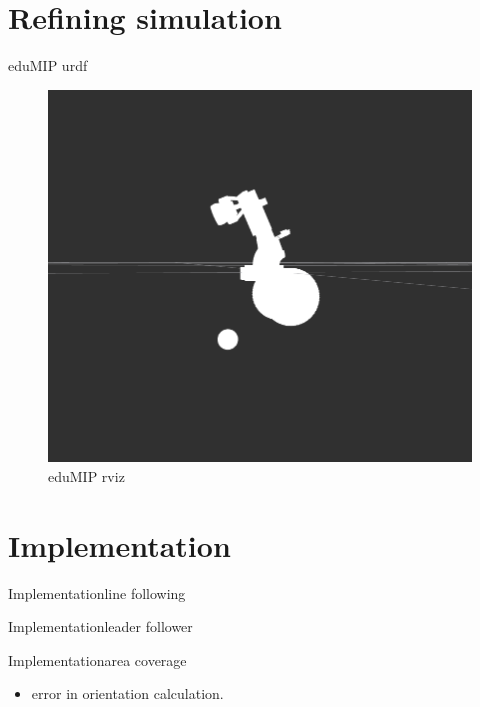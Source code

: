 \documentclass{beamer}
\begin{document}
\section{Refining simulation}
\begin{frame}{eduMIP urdf}
\begin{center}
\begin{figure}
\includegraphics[scale=0.25]{figs/img/rviz.png}
\caption{eduMIP rviz}
\end{figure}
\end{center}
\end{frame}
\section{Implementation}
\begin{frame}{Implementation}{line following}
\end{frame}
\begin{frame}{Implementation}{leader follower}
\end{frame}
\begin{frame}{Implementation}{area coverage}
\begin{itemize}
\item error in orientation calculation.
\end{itemize}
\end{frame}
\end{document}
